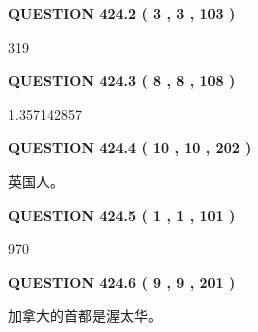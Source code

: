 \documentclass{ctexart}
\begin{document}
 
  
\vspace{0.2in}
  
{\textbf{\Large{QUESTION
424.2 
 ( 3 , 3 , 103 )
}}}
  
  
 
 
\noindent{}

319
 
 
  
\vspace{0.2in}
  
{\textbf{\Large{QUESTION
424.3 
 ( 8 , 8 , 108 )
}}}
  
  
 
 
\noindent{}

1.357142857
 
 
  
\vspace{0.2in}
  
{\textbf{\Large{QUESTION
424.4 
 ( 10 , 10 , 202 )
}}}
  
  
 
 
\noindent{}
 
 
英国人。
 
 
 
 
  
\vspace{0.2in}
  
{\textbf{\Large{QUESTION
424.5 
 ( 1 , 1 , 101 )
}}}
  
  
 
 
\noindent{}

970
 
 
  
\vspace{0.2in}
  
{\textbf{\Large{QUESTION
424.6 
 ( 9 , 9 , 201 )
}}}
  
  
 
 
\noindent{}
 
 
加拿大的首都是渥太华。
 
 
 
 
  
\vspace{0.2in}
  
\end{document}
